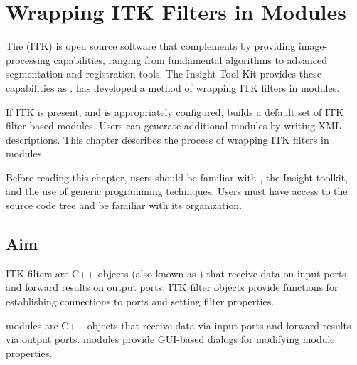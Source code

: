 %
%
%
%
%


\chapter{Wrapping  ITK Filters in \sr{} Modules}
\label{ch:itk_mods}

The  (ITK)
is open source software that complements \sr{} by providing
image-processing capabilities, ranging from fundamental algorithms to
advanced segmentation and registration tools.  The Insight Tool Kit
provides these capabilities as .  \sci{} has developed a
method of wrapping ITK filters in \sr{} modules.

If ITK is present, and \sr{} is appropriately configured, \sr{} 
builds a default set of ITK filter-based modules.  Users can generate 
additional modules by writing XML descriptions. This chapter describes
the process of wrapping ITK filters in \sr{} modules.

Before reading this chapter, users should be familiar with \sr{}, the
Insight toolkit, and the use of generic programming techniques.  Users
must have access to the \sr{} source code tree and be familiar with
its organization.


\section{Aim}
\label{sec:itk_mods:aim}

ITK filters are C++ objects (also known as ) that
receive data on input ports and forward results on output ports.
ITK filter objects provide functions for establishing connections to
ports and setting filter properties.

\sr{} modules are C++ objects that receive data via input ports
and forward results via output ports.  \sr{} modules provide
GUI-based dialogs for modifying  module properties.

